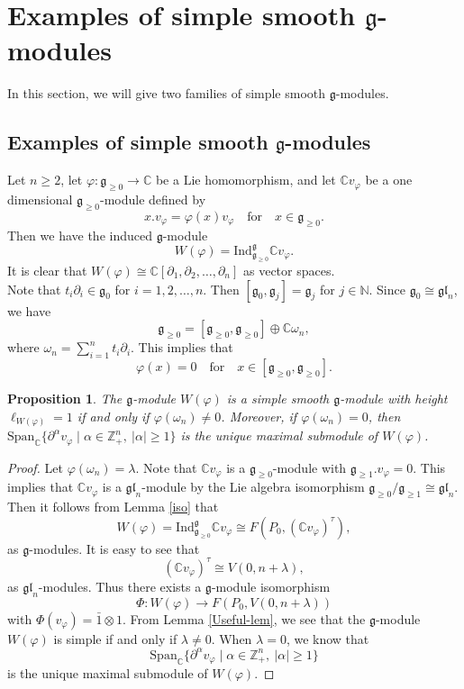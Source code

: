 \documentclass[12pt, a4paper]{amsart}
\newcommand{\fg}{\mathfrak g}
\newcommand{\C}{\mathbb{C}}
\newcommand{\N}{\mathbb N}
\newcommand{\Z}{\mathbb Z}
\def\gl{\mathfrak{gl}}
\theoremstyle{Theorem}
\theoremstyle{Theorem}
\newtheorem{proposition}[thm]{Proposition}
\numberwithin{equation}{section}
\begin{document}
\section{Examples of simple smooth $\fg$-modules}
In this section, we will give two families of simple smooth $\fg$-modules.
\subsection{Examples of simple smooth $\fg$-modules}
Let $n\geq2$, let $\varphi:\fg_{\geq0}\rightarrow\C$ be a Lie homomorphism,
and let $\C v_{\varphi}$ be a one dimensional
$\fg_{\geq0}$-module defined by
\begin{equation}\label{Example-5-1}
	x.v_{\varphi}=\varphi(x)v_{\varphi}\quad \text{for}\quad x\in\fg_{\geq0}.\end{equation}
Then we have the induced $\fg$-module
\[W(\varphi)=\text{Ind}_{\fg_{\geq0}}^{\fg}\C v_{\varphi}.\]
It is clear that $W(\varphi)\cong\C[\partial_{1},\partial_{2},\dots,\partial_{n}]$ as vector spaces.\\
Note that $t_{i}\partial_{i}\in\fg_{0}$ for $i=1,2,\dots,n$.
Then $[\fg_{0},\fg_{j}]=\fg_{j}$ for $j\in\N$. Since $\fg_{0}\cong\gl_{n}$, we have
\[\fg_{\geq0}=[\fg_{\geq0},\fg_{\geq0}]\oplus\C\omega_{n},\]
where $\omega_{n}=\sum_{i=1}^{n}t_{i}\partial_{i}$.
This implies that
\[\varphi(x)=0\quad \text{for}\quad x\in[\fg_{\geq0},\fg_{\geq0}].\]


\begin{proposition}\label{Exam-1} The $\fg$-module
$W(\varphi)$ is a simple smooth $\fg$-module with height $\ell_{W(\varphi)}=1$
if and only if $\varphi(\omega_n)\neq0$. Moreover, if $\varphi(\omega_n)=0$,
then $\mathrm{Span}_{\C}\{\partial^{\alpha}v_{\varphi}\mid\alpha\in\Z_{+}^{n},\ |\alpha|\geq1\}$ is
the unique maximal submodule of $W(\varphi)$.
\end{proposition}
\begin{proof} Let  $\varphi(\omega_n)=\lambda$.
Note that $\C v_{\varphi}$ is a $\fg_{\geq0}$-module with $\fg_{\geq1}.v_{\varphi}=0$. This implies that $\C v_{\varphi}$ is a $\gl_{n}$-module by the Lie algebra isomorphism $\fg_{\geq0}/\fg_{\geq1}\cong\gl_{n}$. 
Then it follows from Lemma \ref{iso} that \[W(\varphi)=\mathrm{Ind}_{\fg_{\geq0}}^{\fg}\C v_{\varphi}\cong F(P_{0},(\C v_{\varphi})^{\tau}),\]as $\fg$-modules. It is easy to see that 
\[(\C v_{\varphi})^{\tau}\cong V(0,n+\lambda),\]
as $\gl_{n}$-modules. 
Thus there exists a $\fg$-module isomorphism
\[\Phi:W(\varphi)\rightarrow F(P_0, V(0,n+\lambda))\]
with $\Phi(v_{\varphi})=\bar{1}\otimes 1$. From Lemma \ref{Useful-lem},
we see that the $\fg$-module $W(\varphi)$ is simple if and only if $\lambda\neq0$.
When $\lambda=0$, we know that \[\mathrm{Span}_{\C}\{\partial^{\alpha}v_{\varphi}\mid\alpha\in\Z_{+}^{n},\ |\alpha|\geq1\}\]
is the unique maximal submodule of $W(\varphi)$.
\end{proof}
\end{document}
